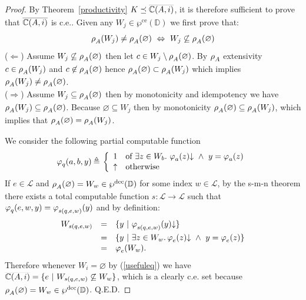 \documentclass[runningheads]{llncs}
\def\ok#1{\mbox{\raisebox{0ex}[1ex][1ex]{$#1$}}}
\def\re{c.e.}
\newcommand{\myqed}{\textsc{Q.E.D.}}
\def\wpre{\wp^{\text{ce}}}
\def\wprec{\wp^{\text{dec}}}
\def\bbbc{{\mathbb{C}}}
\newcommand{\ccL}{\mathscr{L}}
\newcommand{\Domain}{\mathbb{D}}
\newcommand{\pfunction}[3]{\ok{\varphi^{#2\, #3}_{#1}}}
\newcommand{\auco}[2]{\ok{\rho^{#1}_{#2}}}
\newcommand{\compl}[1]{\ok{\overline{#1}}}
\newcommand{\ra}{\rightarrow}
\newcommand{\ud}{\ok{\:\triangleq\:}}
\def\ok#1{\mbox{\raisebox{0ex}[1ex][1ex]{$#1$}}}
\def\cAA{\ensuremath{A}}
\newcommand{\sset}[2]{\{#1  ~|~ #2\}}
\begin{document}
\begin{proof}
    By Theorem~\ref{productivity} $K\preceq \compl{\bbbc(\cAA,i)}$, it is therefore sufficient to prove that $\compl{\bbbc(\cAA,i)}$ is {\re}. Given any $W_j\in\wpre(\Domain)$ we first prove that:
    \begin{equation}\label{usefuleq}
        \auco{}{A}(W_j)\neq\auco{}{A}(\varnothing)~\Leftrightarrow~W_j\not\subseteq\auco{}{A}(\varnothing)
    \end{equation}
    ($\Leftarrow$) Assume $W_j\not\subseteq \auco{}{A}(\varnothing)$ then let $c\in W_j\setminus \auco{}{A}(\varnothing)$. By $\auco{}{A}$ extensivity $c\in\auco{}{A}(W_j)$ and $c\not\in\auco{}{A}(\varnothing)$ hence $\auco{}{A}(\varnothing)\subset \auco{}{A}(W_j)$ which implies $\auco{}{A}(W_j)\neq\auco{}{A}(\varnothing)$. \\
    ($\Rightarrow$) Assume $W_j\subseteq \auco{}{A}(\varnothing)$ then by monotonicity and idempotency we have $\auco{}{A}(W_j)\subseteq\auco{}{A}(\varnothing)$. Because $\varnothing\subseteq W_j$ then by monotonicity $\auco{}{A}(\varnothing)\subseteq \auco{}{A}(W_j)$, which implies that $\auco{}{A}(\varnothing)=\auco{}{A}(W_j)$. 

    We consider the following partial computable function
    \[
    \pfunction{q}{}{}(a,b,y)\ud\left\{
    \begin{array}{ll}
        1 & \mbox{of $\exists z\in W_b.~\pfunction{a}{}{}(z){\downarrow}~\wedge~y=\pfunction{a}{}{}(z)$}\\
        \uparrow &\mbox{otherwise}
    \end{array} \right.
    \]
    If $e\in\ccL$ and $\auco{}{A}(\varnothing)=W_w\in\wprec(\Domain)$ for some index $w\in\ccL$, by the s-m-n theorem there exists a total computable function $s:\ccL\ra\ccL$ such that 
    $\pfunction{q}{}{}(e,w,y)=\pfunction{s(q,e,w)}{}{}(y)$ and by definition:
    \[
    \begin{array}{lll}
    W_{s(q,e,w)} &= & \sset{y}{\pfunction{s(q,e,w)}{}{}(y){\downarrow}}\\[1ex]
    &=& \sset{y}{\exists z\in W_w.\, \pfunction{e}{}{}(z){\downarrow}~\wedge~y=\pfunction{e}{}{}(z)}\\
    &=& \pfunction{e}{}{}(W_w).
    \end{array}
    \]
    Therefore whenever $W_i=\varnothing$ by (\ref{usefuleq}) we have $\compl{\bbbc(\cAA,i)}=\sset{e}{W_{s(q,e,w)}\not\subseteq W_w}$, which is a clearly {\re} set because $\auco{}{A}(\varnothing)=W_w\in\wprec(\Domain)$. \myqed
\end{proof}
\end{document}
